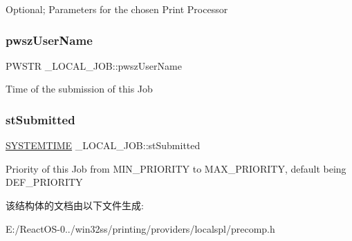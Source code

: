 Optional; Parameters for the chosen Print Processor \mbox{\label{struct___l_o_c_a_l___j_o_b_abb0a19c78f6bef9b08bd4cba2a4fe4ba}} 
\subsubsection{\texorpdfstring{pwsz\+User\+Name}{pwszUserName}}
{\footnotesize\ttfamily P\+W\+S\+TR \+\_\+\+L\+O\+C\+A\+L\+\_\+\+J\+O\+B\+::pwsz\+User\+Name}

Time of the submission of this Job \mbox{\label{struct___l_o_c_a_l___j_o_b_a2b28271c1a0d56ade39511cd06762173}} 
\subsubsection{\texorpdfstring{st\+Submitted}{stSubmitted}}
{\footnotesize\ttfamily \hyperlink{struct___s_y_s_t_e_m_t_i_m_e}{S\+Y\+S\+T\+E\+M\+T\+I\+ME} \+\_\+\+L\+O\+C\+A\+L\+\_\+\+J\+O\+B\+::st\+Submitted}

Priority of this Job from M\+I\+N\+\_\+\+P\+R\+I\+O\+R\+I\+TY to M\+A\+X\+\_\+\+P\+R\+I\+O\+R\+I\+TY, default being D\+E\+F\+\_\+\+P\+R\+I\+O\+R\+I\+TY 

该结构体的文档由以下文件生成\+:\begin{DoxyCompactItemize}
\item 
E\+:/\+React\+O\+S-\/0../win32ss/printing/providers/localspl/precomp.\+h\end{DoxyCompactItemize}
